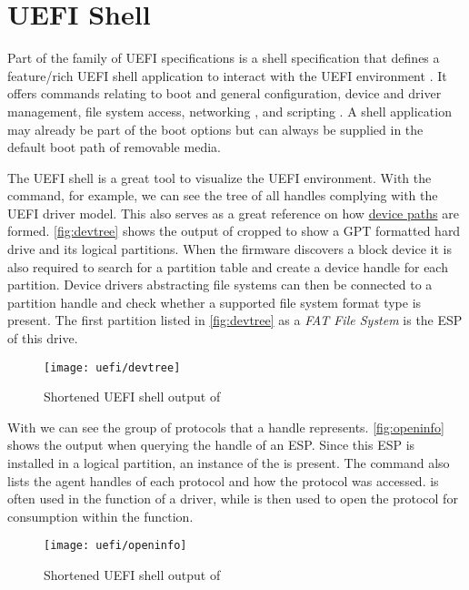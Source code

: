 
\section{\acs{UEFI} Shell}

Part of the family of \ac{UEFI} specifications is a shell specification that defines a feature\-/rich \ac{UEFI} shell application to interact with the \ac{UEFI} environment \cite[Section 1.1]{uefi-shell-spec}.
It offers commands relating to boot and general configuration, device and driver management, file system access, networking \cite[Section 5.1]{uefi-shell-spec}, and scripting \cite[Section 4]{uefi-shell-spec}.
A shell application may already be part of the boot options but can always be supplied in the default boot path of removable media.

The \ac{UEFI} shell is a great tool to visualize the \ac{UEFI} environment.
With the  command, for example, we can see the tree of all handles complying with the \ac{UEFI} driver model.
This also serves as a great reference on how \hyperref[lst:device-path-protocol]{device paths} are formed.
\autoref{fig:devtree} shows the output of  cropped to show a \ac{GPT} formatted hard drive and its logical partitions.
When the firmware discovers a block device it is also required to search for a partition table and create a device handle for each partition.
Device drivers abstracting file systems can then be connected to a partition handle and check whether a supported file system format type is present.
The first partition listed in \autoref{fig:devtree} as a \emph{FAT File System} is the \ac{ESP} of this drive.

\begin{figure}[htb]
    \centering
    \texttt{[image: uefi/devtree]}
    \caption{Shortened \ac{UEFI} shell output of }
    \label{fig:devtree}
\end{figure}

With  we can see the group of protocols that a handle represents.
\autoref{fig:openinfo} shows the output when querying the handle of an \ac{ESP}.
Since this \ac{ESP} is installed in a logical partition, an instance of the  is present.
The command also lists the agent handles of each protocol and how the protocol was accessed.
 is often used in the  function of a driver, while  is then used to open the protocol for consumption within the  function.

\begin{figure}[htb]
    \centering
    \texttt{[image: uefi/openinfo]}
    \caption{Shortened \ac{UEFI} shell output of }
    \label{fig:openinfo}
\end{figure}